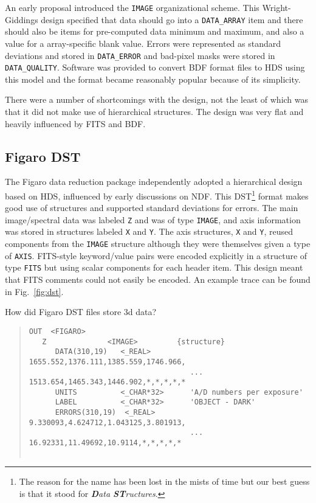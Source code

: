 \documentclass[final,authoryear,5p,times,twocolumn]{elsarticle}
\begin{document}
{An early proposal \citep[][but see also \citet{SGP38}]{WrightGiddings1983} introduced the
\texttt{IMAGE} organizational scheme. This Wright-Giddings design specified that
data should go into a \texttt{DATA\_ARRAY} item and there should also be
items for pre-computed data minimum and maximum, and also a value for
a array-specific blank value. Errors were represented as standard
deviations and stored in \texttt{DATA\_ERROR} and bad-pixel masks were
stored in \texttt{DATA\_QUALITY}. Software was provided to convert BDF
format files to HDS using this model \citep{SUN96} and the format became
reasonably popular because of its simplicity.

There were a number of shortcomings with the design, not the least of
which was that it did not make use of hierarchical structures. The
design was very flat and heavily influenced by FITS and BDF.

\subsection{Figaro DST}

The Figaro data reduction package
\citep[][ascl:1203.013]{1988igbo.conf..448C,1993ASPC...52..219S} independently adopted
a hierarchical design based on HDS, influenced by early discussions on
NDF. This DST\footnote{The reason for the name has been lost in the
  mists of time but our best guess is that it stood for \emph{\textbf{D}ata
  \textbf{ST}ructures}.} format makes good use of structures and supported
standard deviations for errors. The main image/spectral data was
labeled \texttt{Z} and was of type \texttt{IMAGE}, and axis
information was stored in structures labeled \texttt{X} and
\texttt{Y}. The axis structures, \texttt{X} and \texttt{Y},
reused components from the
\texttt{IMAGE} structure although they were themselves given a type of
\texttt{AXIS}. FITS-style keyword/value pairs were encoded explicitly
in a structure of type \texttt{FITS} but using scalar components for
each header item. This design meant that FITS comments could not
easily be encoded. An example trace can be found in Fig.\ \ref{fig:dst}.

{\color{red} How did Figaro DST files store 3d data?}

\begin{figure*}[t]
\begin{minipage}{\textwidth}
\begin{quote}
\small
\begin{verbatim}
OUT  <FIGARO>
   Z              <IMAGE>         {structure}
      DATA(310,19)   <_REAL>         1655.552,1376.111,1385.559,1746.966,
                                     ... 1513.654,1465.343,1446.902,*,*,*,*,*
      UNITS          <_CHAR*32>      'A/D numbers per exposure'
      LABEL          <_CHAR*32>      'OBJECT - DARK'
      ERRORS(310,19)  <_REAL>        9.330093,4.624712,1.043125,3.801913,
                                     ... 16.92331,11.49692,10.9114,*,*,*,*,*


\end{verbatim}
\end{quote}
\end{minipage}
\end{figure*}}
\end{document}
